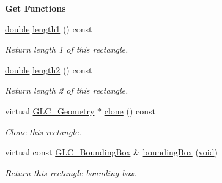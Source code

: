 \begin{Indent}{\bf Get Functions}\par
\begin{DoxyCompactItemize}
\item 
\hyperlink{_super_l_u_support_8h_a8956b2b9f49bf918deed98379d159ca7}{double} \hyperlink{class_g_l_c___rectangle_af0f6e7617609a0adf2426a77177940bb}{length1} () const 
\begin{DoxyCompactList}\small\item\em Return length 1 of this rectangle. \end{DoxyCompactList}\item 
\hyperlink{_super_l_u_support_8h_a8956b2b9f49bf918deed98379d159ca7}{double} \hyperlink{class_g_l_c___rectangle_ac5f3f3e9481e513fbf616251cfbe588a}{length2} () const 
\begin{DoxyCompactList}\small\item\em Return length 2 of this rectangle. \end{DoxyCompactList}\item 
virtual \hyperlink{class_g_l_c___geometry}{G\-L\-C\-\_\-\-Geometry} $\ast$ \hyperlink{class_g_l_c___rectangle_ad4b66f986d8cc4452dd58158f087debd}{clone} () const 
\begin{DoxyCompactList}\small\item\em Clone this rectangle. \end{DoxyCompactList}\item 
virtual const \hyperlink{class_g_l_c___bounding_box}{G\-L\-C\-\_\-\-Bounding\-Box} \& \hyperlink{class_g_l_c___rectangle_ae7e0218d1d7cb8be0ecda25808cb8b3b}{bounding\-Box} (\hyperlink{group___u_a_v_objects_plugin_ga444cf2ff3f0ecbe028adce838d373f5c}{void})
\begin{DoxyCompactList}\small\item\em Return this rectangle bounding box. \end{DoxyCompactList}\end{DoxyCompactItemize}
\end{Indent}
